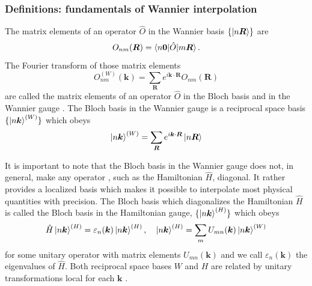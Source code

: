 \documentclass[10pt,a4paper]{article}
\begin{document}
\subsubsection{Definitions: fundamentals of Wannier interpolation}
The matrix elements of an operator $\hat{O}$ in the Wannier basis $\{\ket{n\bm{R}}\}$ are
\begin{equation}
O_{nm}(\bm{R}) = \braket{n\bm{0}|\hat{O}|m\bm{R}}.
\end{equation}
The Fourier transform of those matrix elements
\begin{equation}\label{eq:ft}
O_{nm}^{(W)}(\bm{k}) = \sum_{\bm{R}} e^{i\bm{k}\cdot\bm{R}} O_{nm}(\bm{R})
\end{equation}
are called the matrix elements of an operator $\hat{O}$ in the Bloch basis and in the Wannier gauge \cite{marzariMaximallyLocalizedWannier2012, wangInitioCalculationAnomalous2006, yatesSpectralFermiSurface2007}. The Bloch basis in the Wannier gauge is a reciprocal space basis $\{\ket{n\bm{k}}^{(W)}\}$ which obeys
\begin{equation}
\ket{n\bm{k}}^{(W)} = \sum_{\bm{R}} e^{i\bm{k}\cdot\bm{R}} \ket{n\bm{R}}
\end{equation}

It is important to note that the Bloch basis in the Wannier gauge does not, in general, make any operator \cite{yatesSpectralFermiSurface2007}, such as the Hamiltonian $\hat{H}$, diagonal. It rather provides a localized basis which makes it possible to interpolate most physical quantities with precision. The Bloch basis which diagonalizes the Hamiltonian $\hat{H}$ is called the Bloch basis in the Hamiltonian gauge, $\{\ket{n\bm{k}}^{(H)}\}$ which obeys
\begin{equation}\label{eq:hamil_gauge}
\hat{H}\ket{n\bm{k}}^{(H)} = \varepsilon_n(\bm{k})\ket{n\bm{k}}^{(H)},\quad \ket{n\bm{k}}^{(H)} = \sum_{m} U_{mn}(\bm{k}) \ket{n\bm{k}}^{(W)}
\end{equation}
for some unitary operator with matrix elements $U_{mn}(\bm{k})$ and we call $\varepsilon_n(\bm{k})$ the eigenvalues of $\hat{H}$. Both reciprocal space bases $W$ and $H$ are related by unitary transformations local for each $\bm{k}$ \cite{wangInitioCalculationAnomalous2006}.
\end{document}
